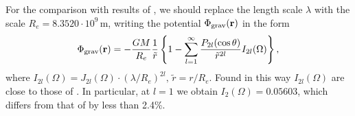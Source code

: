 \documentclass{caosp308}
\begin{document}
For the comparison with results of  \citet{2015MNRAS.448..456K}, we should replace the length scale $\lambda$ with the scale $R_e=8.3520\cdot10^9\,\text{m}$, writing the potential $\Phi_{\rm grav}({\bf r})$ in the form
\begin{equation}
\label{eq_064da}
\Phi_{\rm grav}({\bf r})=-\frac{GM}{R_e}\frac{1}{\tilde{r}}
\left\{1-\sum\limits_{l=1}^{\infty}\frac{P_{2l}(\cos\theta)}{\tilde{r}^{2l}}I_{2l}(\Omega)\right\},
\end{equation}
where $I_{2l}(\Omega)=J_{2l}(\Omega)\cdot(\lambda/R_e)^{2l},\,\tilde{r}=r/R_e$. Found in this way $I_{2l}(\Omega)$ are close to those of \citet{2015MNRAS.448..456K}. In particular, at $l=1$ we obtain $I_2(\Omega)=0.05603$, which differs from that of \citet{2015MNRAS.448..456K} by less than 2.4\%.

\begin{table}[htb]
\caption{The parameters $K$ and $\rho_c$ of the polytropic model according to the averaged rotational velocities of main-sequence stars.(The observable values $M,\,R,\,\omega$ are taken from the work of~\citet{1965Obs....85..166M}).
\label{tab_04da}}
\end{table}
\end{document}
